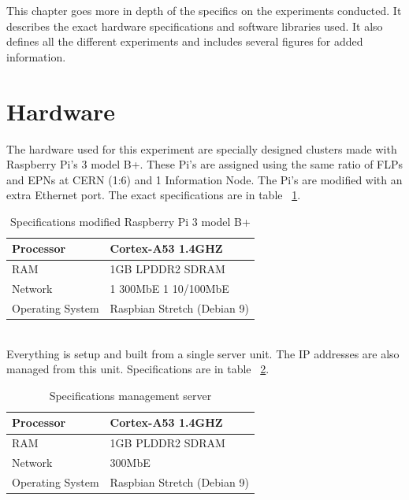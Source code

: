 This chapter goes more in depth of the specifics on the experiments conducted. It describes the exact hardware specifications and software libraries used. It also defines all the different experiments and includes several figures for added information.
\section{Hardware}
The hardware used for this experiment are specially designed clusters made with Raspberry Pi's 3 model B+. These Pi's are assigned using the same ratio of FLPs and EPNs at CERN (1:6) and 1 Information Node. The Pi's are modified with an extra Ethernet port. The exact specifications are in table ~\ref{table:RaspberrySpecifications}.

\begin{table}[htb]
\begin{tabular}{| l | l |}
\hline
Processor & Cortex-A53 1.4GHZ\\ \hline
RAM & 1GB LPDDR2 SDRAM\\ \hline
Network & 1 300MbE 1 10/100MbE \\ \hline
Operating System & Raspbian Stretch (Debian 9)\\ \hline
\end{tabular}
\caption{Specifications modified Raspberry Pi 3 model B+}
\label{table:RaspberrySpecifications}
\end{table}

~\\ Everything is setup and built from a single server unit. The IP addresses are also managed from this unit. Specifications are in table ~\ref{table:ManagementSpecifications}.

\begin{table}[htb]
\begin{tabular}{| l | l |}
\hline
Processor & Cortex-A53 1.4GHZ\\ \hline
RAM & 1GB PLDDR2 SDRAM\\ \hline
Network & 300MbE\\ \hline
Operating System & Raspbian Stretch (Debian 9)\\ \hline
\end{tabular}
\caption{Specifications management server}
\label{table:ManagementSpecifications}
\end{table}

\newpage

